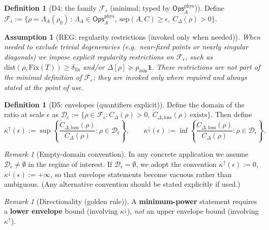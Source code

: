 \documentclass[11pt]{article}
\newtheorem{assumption}[theorem]{Assumption}
\theoremstyle{definition}
\newtheorem{definition}[theorem]{Definition}
\theoremstyle{remark}
\newtheorem{remark}[theorem]{Remark}
\newcommand{\Ops}{\mathsf{Ops}^{\mathrm{phys}}_A}
\begin{document}
\begin{definition}[D4: the family $\mathcal{F}_\epsilon$ (minimal; typed
by $\Ops$)]
\label{def:family}
Define
$\mathcal{F}_\epsilon := \bigl\{\rho = \Lambda_A(\rho_0) \,:\, \Lambda_A
\in \Ops,\ \mathrm{sep}(A, C) \ge \epsilon,\ C_\Delta(\rho) > 0\bigr\}$.
\end{definition}

\begin{assumption}[REG: regularity restrictions (invoked only when
needed)]
\label{ass:reg}
When needed to exclude trivial degeneracies (e.g.\ near-fixed points or
nearly singular diagonals) we impose explicit regularity restrictions on
$\mathcal{F}_\epsilon$, such as $\mathrm{dist}(\rho, \mathrm{Fix}(T))
\ge \delta_{\mathrm{fix}}$ and/or $\Delta[\rho] \succeq
p_{\min}\mathbf{1}$. These restrictions are not part of the minimal
definition of $\mathcal{F}_\epsilon$; they are invoked only where
required and always stated at the point of use.
\end{assumption}

\begin{definition}[D5: envelopes (quantifiers explicit)]
\label{def:envelopes}
Define the domain of the ratio at scale $\epsilon$ as
$\mathcal{D}_\epsilon := \bigl\{\rho \in \mathcal{F}_\epsilon :
C_\Delta(\rho) > 0,\ \dot{C}_{\Delta,\mathrm{loss}}(\rho)\
\text{exists}\bigr\}$. Then define
\[
\kappa^{\uparrow}(\epsilon) := \sup\left\{
\frac{\dot{C}_{\Delta,\mathrm{loss}}(\rho)}{C_\Delta(\rho)} : \rho \in
\mathcal{D}_\epsilon \right\}, \qquad
\kappa^{\downarrow}(\epsilon) := \inf\left\{
\frac{\dot{C}_{\Delta,\mathrm{loss}}(\rho)}{C_\Delta(\rho)} : \rho \in
\mathcal{D}_\epsilon \right\}.
\]
\end{definition}

\begin{remark}[Empty-domain convention]
\label{rem:empty}
In any concrete application we assume $\mathcal{D}_\epsilon \ne
\emptyset$ in the regime of interest. If $\mathcal{D}_\epsilon =
\emptyset$, we adopt the convention $\kappa^{\uparrow}(\epsilon) := 0$,
$\kappa^{\downarrow}(\epsilon) := +\infty$, so that envelope statements
become vacuous rather than ambiguous. (Any alternative convention should
be stated explicitly if used.)
\end{remark}

\begin{remark}[Directionality (golden rule)]
\label{rem:golden}
A \textbf{minimum-power} statement requires a \textbf{lower envelope}
bound (involving $\kappa^{\downarrow}$), \emph{not} an upper envelope
bound (involving $\kappa^{\uparrow}$).
\end{remark}
\end{document}
